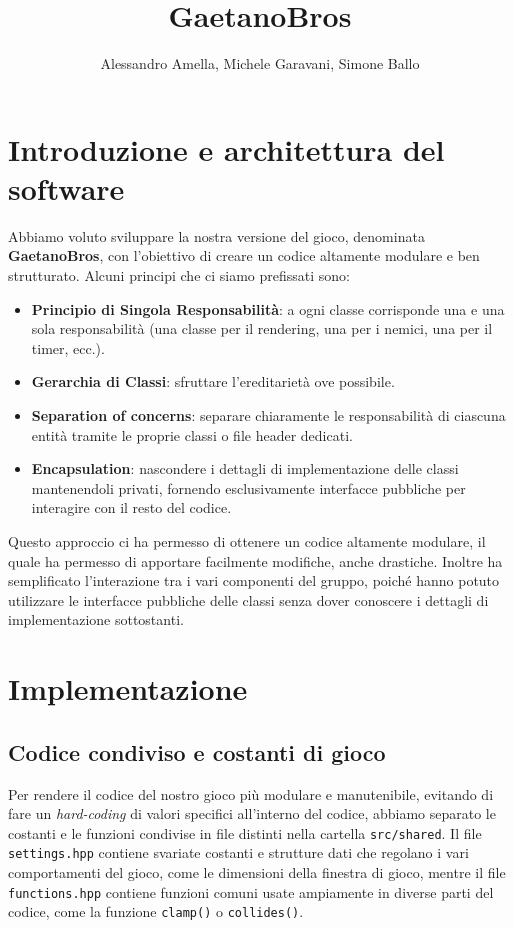 \documentclass[a4paper,12pt]{article}
\title{\textbf{GaetanoBros}}
\author{Alessandro Amella, Michele Garavani, Simone Ballo}
\date{\formatdate{2}{9}{2023}}
\begin{document}
\maketitle

\section{Introduzione e architettura del software}
Abbiamo voluto sviluppare la nostra versione del gioco, denominata \textbf{GaetanoBros}, con l'obiettivo di creare un codice altamente modulare e ben strutturato. Alcuni principi che ci siamo prefissati sono:
\begin{itemize}
\item \textbf{Principio di Singola Responsabilità}: a ogni classe corrisponde una e una sola responsabilità (una classe per il rendering, una per i nemici, una per il timer, ecc.).
\item \textbf{Gerarchia di Classi}: sfruttare l'ereditarietà ove possibile.
\item \textbf{Separation of concerns}: separare chiaramente le responsabilità di ciascuna entità tramite le proprie classi o file header dedicati.
\item \textbf{Encapsulation}: nascondere i dettagli di implementazione delle classi mantenendoli privati, fornendo esclusivamente interfacce pubbliche per interagire con il resto del codice.
\end{itemize}

Questo approccio ci ha permesso di ottenere un codice altamente modulare, il quale ha permesso di apportare facilmente modifiche, anche drastiche. Inoltre ha semplificato l'interazione tra i vari componenti del gruppo, poiché hanno potuto utilizzare le interfacce pubbliche delle classi senza dover conoscere i dettagli di implementazione sottostanti.


\section{Implementazione}
\subsection{Codice condiviso e costanti di gioco}
Per rendere il codice del nostro gioco più modulare e manutenibile, evitando di fare un \textit{hard-coding} di valori specifici all'interno del codice, abbiamo separato le costanti e le funzioni condivise in file distinti nella cartella \texttt{src/shared}. Il file \texttt{settings.hpp} contiene svariate costanti e strutture dati che regolano i vari comportamenti del gioco, come le dimensioni della finestra di gioco, mentre il file \texttt{functions.hpp} contiene funzioni comuni usate ampiamente in diverse parti del codice, come la funzione \texttt{clamp()} o \texttt{collides()}.
\end{document}
